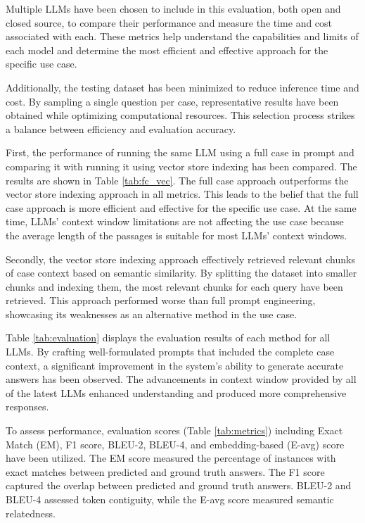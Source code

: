 \documentclass[onecolumn, conference]{IEEEtran}
\begin{document}
Multiple LLMs have been chosen to include in this evaluation, both open and closed source, to compare their performance and measure the time and cost associated with each. These metrics help understand the capabilities and limits of each model and determine the most efficient and effective approach for the specific use case.

Additionally, the testing dataset has been minimized to reduce inference time and cost. By sampling a single question per case, representative results have been obtained while optimizing computational resources. This selection process strikes a balance between efficiency and evaluation accuracy.

First, the performance of running the same LLM using a full case in prompt and comparing it with running it using vector store indexing has been compared. The results are shown in Table \ref{tab:fc_vec}. The full case approach outperforms the vector store indexing approach in all metrics. This leads to the belief that the full case approach is more efficient and effective for the specific use case. At the same time, LLMs' context window limitations are not affecting the use case because the average length of the passages is suitable for most LLMs' context windows.

Secondly, the vector store indexing approach effectively retrieved relevant chunks of case context based on semantic similarity. By splitting the dataset into smaller chunks and indexing them, the most relevant chunks for each query have been retrieved. This approach performed worse than full prompt engineering, showcasing its weaknesses as an alternative method in the use case.

Table \ref{tab:evaluation} displays the evaluation results of each method for all LLMs. By crafting well-formulated prompts that included the complete case context, a significant improvement in the system's ability to generate accurate answers has been observed. The advancements in context window provided by all of the latest LLMs enhanced understanding and produced more comprehensive responses.

To assess performance, evaluation scores (Table \ref{tab:metrics}) including Exact Match (EM), F1 score, BLEU-2, BLEU-4, and embedding-based (E-avg) score have been utilized. The EM score measured the percentage of instances with exact matches between predicted and ground truth answers. The F1 score captured the overlap between predicted and ground truth answers. BLEU-2 and BLEU-4 assessed token contiguity, while the E-avg score measured semantic relatedness.
\end{document}
